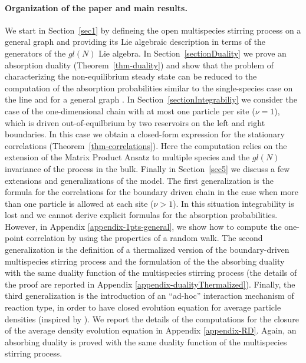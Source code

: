 \documentclass[10pt]{article}
\numberwithin{equation}{section}
\numberwithin{equation}{subsection}
\begin{document}
\paragraph{Organization of the paper and main results.}
We start in Section~\ref{sec1} by defineing the open multispecies stirring
process on a general graph and providing its Lie algebraic description in terms of the generators of the $gl(N)$ Lie algebra. In Section~\ref{sectionDuality} we prove an absorption duality (Theorem~\ref{thm-duality})
and show that the problem of characterizing the non-equilibrium
steady state can be reduced to the computation of the absorption probabilities similar to the single-species case on the line  \cite{KMP} and for a general graph \cite{ frassek2020duality}.  
In Section~\ref{sectionIntegrabiliy}  we consider  the case of the one-dimensional chain with at most one 
particle per site ($\nu=1$), which is driven out-of-equilbrium by two reservoirs on the left and right boundaries. In this case we obtain a closed-form expression for the stationary correlations (Theorem~\ref{thm-correlations}). Here the computation
relies on the extension of the  Matrix Product Ansatz \cite{derrida1993exact} to multiple species \cite{vanicat2017exact} and the $gl(N)$ invariance of the process in the bulk. Finally in Section~\ref{sec5} we discuss a few extensions 
and generalizations of the model. 
The first generalization is the formula for the correlations for the boundary driven chain in the case when more than one particle is allowed at each site ($\nu > 1$). 
In this situation integrability is lost and we cannot derive explicit formulas for the absorption probabilities. However, in Appendix \ref{appendix-1pts-general}, we show how to compute the one-point correlation by using the properties of a random walk. The second generalization is the definition of a thermalized version of the boundary-driven multispecies stirring process and the formulation of the the absorbing duality with the same duality function of the multispecies stirring process (the details of the proof are reported in Appendix \ref{appendix-dualityThermalized}). Finally, the third generalization is the introduction of an ``ad-hoc'' interaction mechanism of reaction type, in order to have closed evolution equation for average particle densities (inspired by \cite{casini2022uphill,schutzReaction}). 
We report the details of the computations for the closure of the average density evolution equation in Appendix \ref{appendix-RD}. 
Again, an absorbing duality is proved with the same duality function of the multispecies stirring process.   
\end{document}

